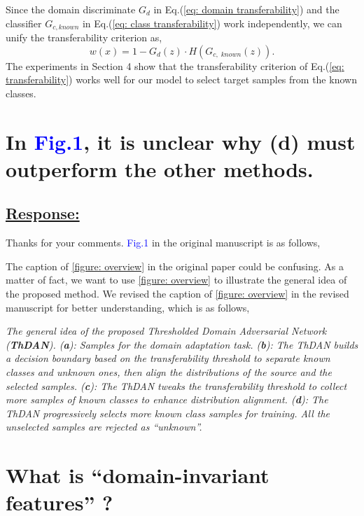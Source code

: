 Since the domain discriminate $G_d$ in Eq.(\ref{eq: domain transferability}) and the classifier $G_{c, known}$ in Eq.(\ref{eq: class transferability}) work independently, we can unify the transferability criterion as,
\begin{equation}
    \label{eq: transferability}
    w(x)=1-G_d(z)\cdot H(G_{c,\; known}(z)).
\end{equation}
The experiments in Section 4 show that the transferability criterion of Eq.(\ref{eq: transferability}) works well for our model to select target samples from the known classes.


\section{In \textcolor{blue}{Fig.1}, it is unclear why (d) must outperform the other methods.}
\subsection*{\underline{\textbf{Response:}}}

Thanks for your comments.
\textcolor{blue}{Fig.1} in the original manuscript is as follows,


The caption of \figurename{\ref{figure: overview}} in the original paper could be confusing.
As a matter of fact, we want to use \figurename{\ref{figure: overview}} to illustrate the general idea of the proposed method.
We revised the caption of \figurename{\ref{figure: overview}} in the revised manuscript for better understanding, which is as follows,
\begin{siderules}
    \textit{
        \footnotesize
        The general idea of the proposed Thresholded Domain Adversarial Network (\textit{\textbf{ThDAN}}).
        (\textbf{a}): Samples for the domain adaptation task.
        (\textbf{b}): The ThDAN builds a decision boundary based on the transferability threshold to separate known classes and unknown ones, then align the distributions of the source and the selected samples.
        (\textbf{c}): The ThDAN tweaks the transferability threshold to collect more samples of known classes to enhance distribution alignment.
        (\textbf{d}): The ThDAN progressively selects more known class samples for training.
        All the unselected samples are rejected as ``unknown''.
    }
\end{siderules}


\section{What is ``domain-invariant features'' ?}
